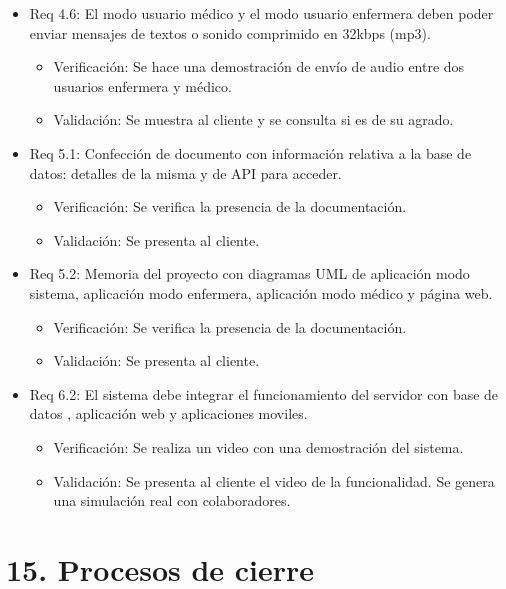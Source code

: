 \documentclass[
11pt, %
]{charter}
\begin{document}
\begin{itemize}
\item Req 4.6: El modo usuario médico y el modo usuario enfermera deben poder enviar mensajes de textos o sonido comprimido en 32kbps (mp3).
	\begin{itemize}
	\item Verificación: Se hace una demostración de envío de audio entre dos usuarios enfermera y médico.
	\item Validación:  Se muestra al cliente y se consulta si es de su agrado.
	\end{itemize}		

\item Req 5.1: Confección de documento con información relativa a la base de datos: detalles de la misma y de API para acceder.
	\begin{itemize}
	\item Verificación: Se verifica la presencia de la documentación.
	\item Validación:  Se presenta al cliente.
	\end{itemize}	

\item Req 5.2: Memoria del proyecto con diagramas UML de aplicación modo sistema, aplicación modo enfermera, aplicación modo médico y página web.

	\begin{itemize}
	\item Verificación: Se verifica la presencia de la documentación.
	\item Validación:  Se presenta al cliente.
	\end{itemize}		
		
\item Req 6.2: El sistema debe integrar el funcionamiento del servidor con base de datos , aplicación web y aplicaciones moviles.

	\begin{itemize}
	\item Verificación: Se realiza un video con una demostración del sistema.
	\item Validación:  Se presenta al cliente el video de la funcionalidad. Se genera una simulación real con colaboradores.
	\end{itemize}		


\end{itemize}



\section{15. Procesos de cierre}    
\label{sec:cierre}
\end{document}
